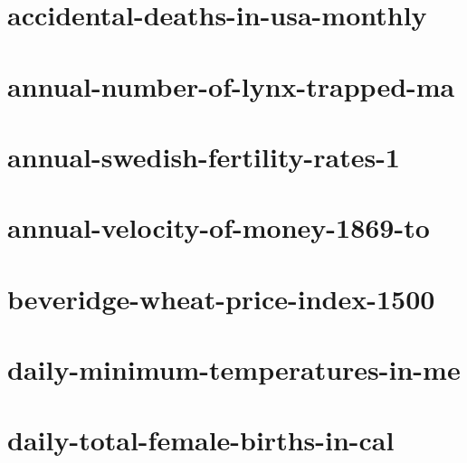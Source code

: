 \documentclass[twoside]{article}
\begin{document}
\section{accidental-deaths-in-usa-monthly}

    

\section{annual-number-of-lynx-trapped-ma}

    

\section{annual-swedish-fertility-rates-1}

    

\section{annual-velocity-of-money-1869-to}

    

\section{beveridge-wheat-price-index-1500}

    

\section{daily-minimum-temperatures-in-me}

    

\section{daily-total-female-births-in-cal}

    
\end{document}
